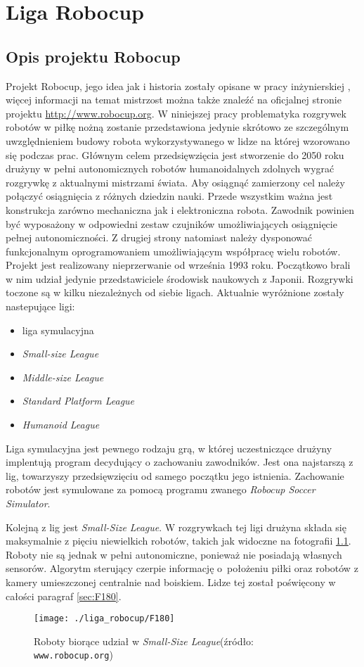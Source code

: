 \chapter{Liga Robocup \label{chap:robocup}}
\section{Opis projektu Robocup \label{sec:opis_robocup}}
	Projekt Robocup, jego idea jak i historia zostały opisane w pracy inżynierskiej \cite{inzynierka}, więcej informacji na temat mistrzost można także znaleźć na oficjalnej stronie projektu
	\mbox{\url{http://www.robocup.org}}. W niniejszej pracy problematyka rozgrywek robotów w piłkę nożną zostanie przedstawiona jedynie skrótowo ze szczególnym uwzględnieniem
	budowy robota wykorzystywanego w lidze na której wzorowano się podczas prac.
	Głównym celem przedsięwzięcia jest stworzenie do 2050 roku drużyny w pełni autonomicznych robotów humanoidalnych zdolnych wygrać rozgrywkę z aktualnymi mistrzami 
	świata.
	Aby osiągnąć zamierzony cel należy połączyć osiągnięcia z różnych dziedzin nauki. Przede wszystkim ważna jest konstrukcja zarówno mechaniczna jak i elektroniczna
	robota. Zawodnik powinien być wyposażony w odpowiedni zestaw czujników umożliwiających osiągnięcie pełnej autonomiczności. 
	Z drugiej strony natomiast należy dysponować funkcjonalnym oprogramowaniem umożliwiającym współpracę wielu robotów.
	Projekt jest realizowany nieprzerwanie od września 1993 roku. Początkowo brali w nim udział jedynie przedstawiciele środowisk naukowych z Japonii.
	Rozgrywki toczone są w kilku niezależnych od siebie ligach.
	Aktualnie wyróżnione zostały nastepujące ligi:
	\begin{itemize}
	\item liga symulacyjna
	\item \emph{Small-size League}
	\item \emph{Middle-size League}
	\item \emph{Standard Platform League }
	\item \emph{Humanoid League}
	\end{itemize}
	Liga symulacyjna jest pewnego rodzaju grą, w której uczestniczące drużyny implentują program decydujący o zachowaniu zawodników.
	Jest ona najstarszą z lig, towarzyszy przedsięwzięciu od samego początku jego istnienia.
	Zachowanie robotów jest symulowane za pomocą programu zwanego \emph{Robocup Soccer Simulator}.

	Kolejną z lig jest \emph{Small-Size League}. W rozgrywkach tej ligi drużyna składa się maksymalnie z pięciu niewielkich robotów, takich jak widoczne na fotografii \ref{fig:F180}. 
	Roboty  nie są jednak w pełni autonomiczne, ponieważ nie
	posiadają własnych sensorów. Algorytm sterujący czerpie informację o~położeniu piłki oraz robotów z kamery
	umieszczonej centralnie nad boiskiem. Lidze tej został poświęcony w całości paragraf \ref{sec:F180}.	
	\begin{figure}[ht]
	\centering
	\texttt{[image: ./liga\_robocup/F180]}
	\caption{ Roboty biorące udział w \emph{Small-Size League}\newline(źródło: \texttt{www.robocup.org})} \label{fig:F180}
	\end{figure}
	
